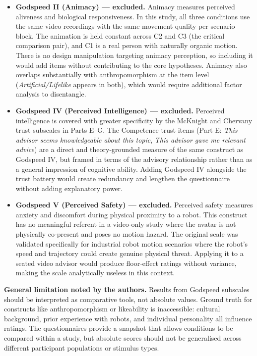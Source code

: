 \documentclass[11pt, a4paper]{article}
\begin{document}
\begin{itemize}
  \item \textbf{Godspeed II (Animacy) --- excluded.} Animacy measures perceived aliveness and biological responsiveness. In this study, all three conditions use the same video recordings with the same movement quality per scenario block. The animation is held constant across C2 and C3 (the critical comparison pair), and C1 is a real person with naturally organic motion. There is no design manipulation targeting animacy perception, so including it would add items without contributing to the core hypotheses. Animacy also overlaps substantially with anthropomorphism at the item level (\textit{Artificial/Lifelike} appears in both), which would require additional factor analysis to disentangle.

  \item \textbf{Godspeed IV (Perceived Intelligence) --- excluded.} Perceived intelligence is covered with greater specificity by the McKnight and Chervany trust subscales in Parts E--G. The Competence trust items (Part E: \textit{This advisor seems knowledgeable about this topic}, \textit{This advisor gave me relevant advice}) are a direct and theory-grounded measure of the same construct as Godspeed IV, but framed in terms of the advisory relationship rather than as a general impression of cognitive ability. Adding Godspeed IV alongside the trust battery would create redundancy and lengthen the questionnaire without adding explanatory power.

  \item \textbf{Godspeed V (Perceived Safety) --- excluded.} Perceived safety measures anxiety and discomfort during physical proximity to a robot. This construct has no meaningful referent in a video-only study where the avatar is not physically co-present and poses no motion hazard. The original scale was validated specifically for industrial robot motion scenarios where the robot's speed and trajectory could create genuine physical threat. Applying it to a seated video advisor would produce floor-effect ratings without variance, making the scale analytically useless in this context.
\end{itemize}

\medskip
\noindent\textbf{General limitation noted by the authors.} Results from Godspeed subscales should be interpreted as comparative tools, not absolute values. Ground truth for constructs like anthropomorphism or likeability is inaccessible: cultural background, prior experience with robots, and individual personality all influence ratings. The questionnaires provide a snapshot that allows conditions to be compared within a study, but absolute scores should not be generalised across different participant populations or stimulus types.
\end{document}

